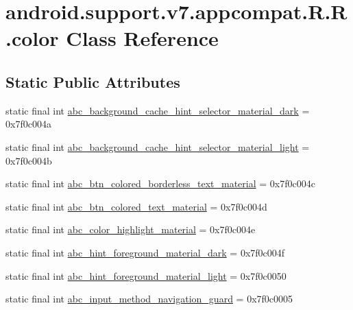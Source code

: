 \hypertarget{classandroid_1_1support_1_1v7_1_1appcompat_1_1_r_1_1color}{
\section{android.support.v7.appcompat.R.R.color Class Reference}
\label{classandroid_1_1support_1_1v7_1_1appcompat_1_1_r_1_1color}
}
\subsection*{Static Public Attributes}
\begin{CompactItemize}
\item 
static final int \hyperlink{classandroid_1_1support_1_1v7_1_1appcompat_1_1_r_1_1color_f303afd51d0acb06eb9d3f82af1f73e4}{abc\_\-background\_\-cache\_\-hint\_\-selector\_\-material\_\-dark} = 0x7f0c004a
\item 
static final int \hyperlink{classandroid_1_1support_1_1v7_1_1appcompat_1_1_r_1_1color_dd36b96d7ae709b00748eb2b5e8dc6a0}{abc\_\-background\_\-cache\_\-hint\_\-selector\_\-material\_\-light} = 0x7f0c004b
\item 
static final int \hyperlink{classandroid_1_1support_1_1v7_1_1appcompat_1_1_r_1_1color_7c9da4cd1b146a4cf0672c8dbd4b9b42}{abc\_\-btn\_\-colored\_\-borderless\_\-text\_\-material} = 0x7f0c004c
\item 
static final int \hyperlink{classandroid_1_1support_1_1v7_1_1appcompat_1_1_r_1_1color_a41898ef6b22b5a9965199ac65930cda}{abc\_\-btn\_\-colored\_\-text\_\-material} = 0x7f0c004d
\item 
static final int \hyperlink{classandroid_1_1support_1_1v7_1_1appcompat_1_1_r_1_1color_e96af621f1b07e79c5cd8ceb8c00fd96}{abc\_\-color\_\-highlight\_\-material} = 0x7f0c004e
\item 
static final int \hyperlink{classandroid_1_1support_1_1v7_1_1appcompat_1_1_r_1_1color_9044646389c471d3323a3f60759e76a5}{abc\_\-hint\_\-foreground\_\-material\_\-dark} = 0x7f0c004f
\item 
static final int \hyperlink{classandroid_1_1support_1_1v7_1_1appcompat_1_1_r_1_1color_b4da1d155cfeed9d4f8df6ce3530ce3f}{abc\_\-hint\_\-foreground\_\-material\_\-light} = 0x7f0c0050
\item 
static final int \hyperlink{classandroid_1_1support_1_1v7_1_1appcompat_1_1_r_1_1color_dc68b9cc3e960445676fde0a4edfd54c}{abc\_\-input\_\-method\_\-navigation\_\-guard} = 0x7f0c0005
\item 

\end{CompactItemize}
